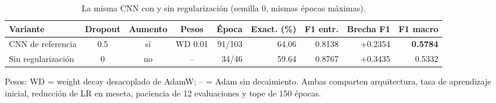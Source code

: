 \begin{table}[htbp]
\centering
\caption{La misma CNN con y sin regularización (semilla 0, mismas épocas máximas).}
\label{tab:regularizacion}
\small
\begin{tabular}{lcccrrrrr}
\toprule
Variante & Dropout & Aumento & Pesos & Época & Exact. (\%) & F1 entr. & Brecha F1 & F1 macro \\
\midrule
CNN de referencia & 0.5 & sí & WD 0.01 & 91/103 & 64.06 & 0.8138 & +0.2354 & \textbf{0.5784} \\
Sin regularización & 0 & no & -- & 34/46 & 59.64 & 0.8767 & +0.3435 & 0.5332 \\
\bottomrule
\end{tabular}
\par\smallskip
\parbox{0.95\textwidth}{\footnotesize Pesos: WD = weight decay desacoplado de AdamW; -- = Adam sin decaimiento. Ambas comparten arquitectura, tasa de aprendizaje inicial, reducción de LR en meseta, paciencia de 12 evaluaciones y tope de 150 épocas.}
\end{table}
